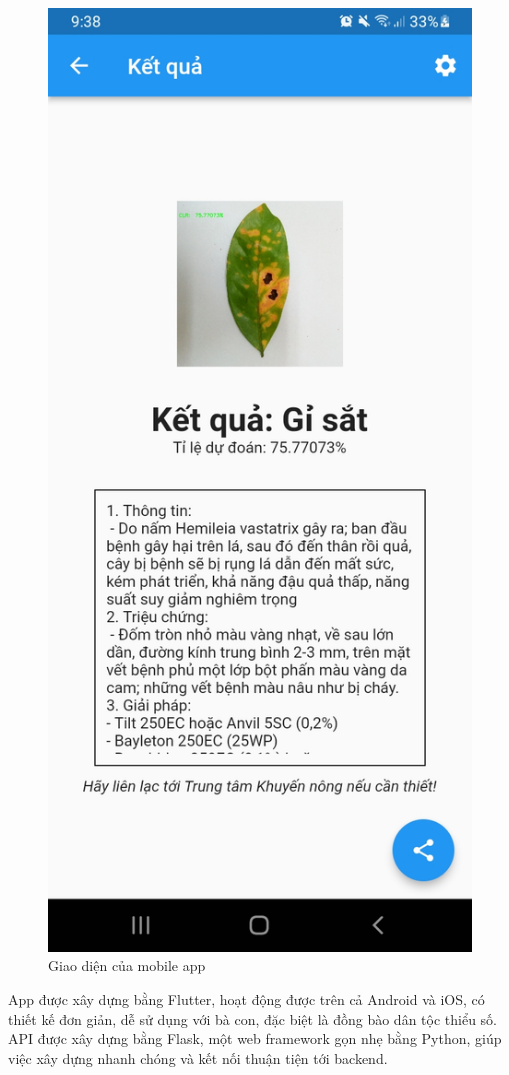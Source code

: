 \documentclass[a4paper,14pt]{extarticle}
\begin{document}
\begin{figure}[H]
		\includegraphics[scale=0.1]{images/screenshot4.jpg}
		\caption{Giao diện của mobile app}
	\end{figure}

	App được xây dựng bằng Flutter, hoạt động được trên cả Android và iOS, có thiết kế đơn giản, dễ sử dụng với bà con, đặc biệt là đồng bào dân tộc thiểu số. API được xây dựng bằng Flask, một web framework gọn nhẹ bằng Python, giúp việc xây dựng nhanh chóng và kết nối thuận tiện tới backend.
\end{document}
